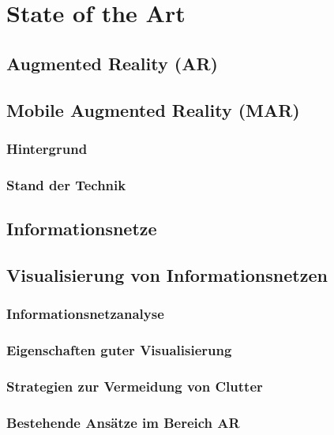 %
\chapter{State of the Art}
\label{sec:sota}



\Blindtext[2][1]

\section{Augmented Reality (AR)}
\label{sec:sota:ar}

\Blindtext[2][2]

\section{Mobile Augmented Reality (MAR)}
\label{sec:sota:mar}
\subsection{Hintergrund}
\subsection{Stand der Technik}

\Blindtext[3][2]

\section{Informationsnetze}
\label{sec:sota:inets}

\Blindtext[4][2]

\section{Visualisierung von Informationsnetzen}
\label{sec:sota:visualization}

\subsection{Informationsnetzanalyse}
\subsection{Eigenschaften guter Visualisierung}
\subsection{Strategien zur Vermeidung von Clutter}
\subsection{Bestehende Ansätze im Bereich AR}
\Blindtext[2][1]
